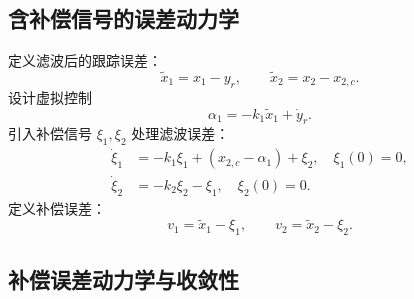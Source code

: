 \documentclass[UTF8,a4paper,11pt]{ctexart}
\begin{document}
\subsection{含补偿信号的误差动力学}

定义滤波后的跟踪误差：
\begin{equation}
\tilde{x}_1 = x_1 - y_r, \qquad \tilde{x}_2 = x_2 - x_{2,c}.
\end{equation}
设计虚拟控制
\begin{equation}
\alpha_1 = -k_1\tilde{x}_1 + \dot{y}_r.
\end{equation}
引入补偿信号 $\xi_1, \xi_2$ 处理滤波误差：
\begin{align}
\dot{\xi}_1 &= -k_1\xi_1 + (x_{2,c} - \alpha_1) + \xi_2, \quad \xi_1(0)=0, \\
\dot{\xi}_2 &= -k_2\xi_2 - \xi_1, \quad \xi_2(0)=0.
\end{align}
定义补偿误差：
\begin{equation}
v_1 = \tilde{x}_1 - \xi_1, \qquad v_2 = \tilde{x}_2 - \xi_2.
\end{equation}

\subsection{补偿误差动力学与收敛性}
\end{document}
